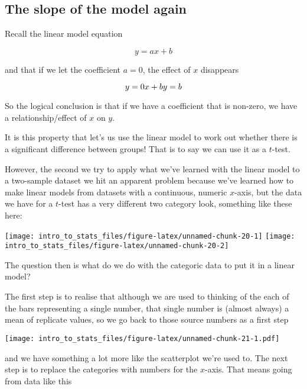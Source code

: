 \documentclass[]{book}
\begin{document}
\hypertarget{the-slope-of-the-model-again}{%
\subsection{The slope of the model again}\label{the-slope-of-the-model-again}}

Recall the linear model equation

\begin{equation}
y = ax + b
\end{equation}

and that if we let the coefficient \(a = 0\), the effect of \(x\) disappears

\begin{equation}
y = 0 x + b\\
y = b
\end{equation}

So the logical conclusion is that if we have a coefficient that is non-zero, we have a relationship/effect of \(x\) on \(y\).

It is this property that let's us use the linear model to work out whether there is a significant difference between groups! That is to say we can use it as a \(t\)-test.

However, the second we try to apply what we've learned with the linear model to a two-sample dataset we hit an apparent problem because we've learned how to make linear models from datasets with a continuous, numeric \(x\)-axis, but the data we have for a \(t\)-test has a very different two category look, something like these here:

\texttt{[image: intro\_to\_stats\_files/figure-latex/unnamed-chunk-20-1]} \texttt{[image: intro\_to\_stats\_files/figure-latex/unnamed-chunk-20-2]}

The question then is what do we do with the categoric data to put it in a linear model?

The first step is to realise that although we are used to thinking of the each of the bars representing a single number, that single number is (almost always) a mean of replicate values, so we go back to those source numbers as a first step

\texttt{[image: intro\_to\_stats\_files/figure-latex/unnamed-chunk-21-1.pdf]}

and we have something a lot more like the scatterplot we're used to. The next step is to replace the categories with numbers for the \(x\)-axis. That means going from data like this
\end{document}
